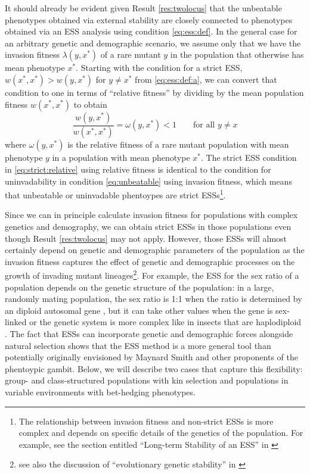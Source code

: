 \documentclass[11pt]{article}
\newcommand{\ess}[1]{#1^*}
\newcommand{\eig}{\lambda}
\begin{document}
It should already be evident given Result \ref{res:twolocus} that the unbeatable phenotypes obtained via external stability are closely connected to phenotypes obtained via an ESS analysis using condition \eqref{eq:ess:def}. In the general case for an arbitrary genetic and demographic scenario, we assume only that we have the invasion fitness $\eig(y, \ess{x})$ of a rare mutant $y$ in the population that otherwise has mean phenotype $\ess{x}$. Starting with the condition for a strict ESS, $w(\ess{x}, \ess{x}) > w(y, \ess{x})$ for $y \ne \ess{x}$ from \eqref{eq:ess:def:a}, we can convert that condition to one in terms of ``relative fitness'' by dividing by the mean population fitness $w(\ess{x}, \ess{x})$ to obtain
\begin{equation}
  \label{eq:strict:relative}
  \frac{w(y, \ess{x})}{w(\ess{x}, \ess{x})} = \omega(y, \ess{x}) < 1 \qquad \text{for all } y \ne x
\end{equation}
where $\omega(y, \ess{x})$ is the relative fitness of a rare mutant population with mean phenotype $y$ in a population with mean phenotype $\ess{x}$. The strict ESS condition in \eqref{eq:strict:relative} using relative fitness is identical to the condition for uninvadability in condition \eqref{eq:unbeatable} using invasion fitness, which means that unbeatable or uninvadable phentoypes are strict ESSs\footnote{The relationship between invasion fitness and non-strict ESSs is more complex and depends on specific details of the genetics of the population. For example, see the section entitled ``Long-term Stability of an ESS'' in \cite{Eshel:Feldman:1998}}.

Since we can in principle calculate invasion fitness for populations with complex genetics and demography, we can obtain strict ESSs in those populations even though Result \ref{res:twolocus} may not apply. However, those ESSs will almost certainly depend on genetic and demographic parameters of the population as the invasion fitness captures the effect of genetic and demographic processes on the growth of invading mutant lineages\footnote{see also the discussion of ``evolutionary genetic stability'' in \cite[pp. 505--506]{Eshel:1996}}. For example, the ESS for the sex ratio of a population depends on the genetic structure of the population: in a large, randomly mating population, the sex ratio is 1:1 when the ratio is determined by an diploid autosomal gene \cite{Fisher:1958,Hamilton:1967,Eshel:Feldman:1982}, but it can take other values when the gene is sex-linked or the genetic system is more complex like in insects that are haplodiploid \cite{Hamilton:1967,Eshel:Feldman:1982a}. The fact that ESSs can incorporate genetic and demographic forces alongside natural selection shows that the ESS method is a more general tool than potentially originally envisioned by Maynard Smith and other proponents of the phentoypic gambit. Below, we will describe two cases that capture this flexibility: group- and class-structured populations with kin selection and populations in variable environments with bet-hedging phenotypes.
\end{document}
